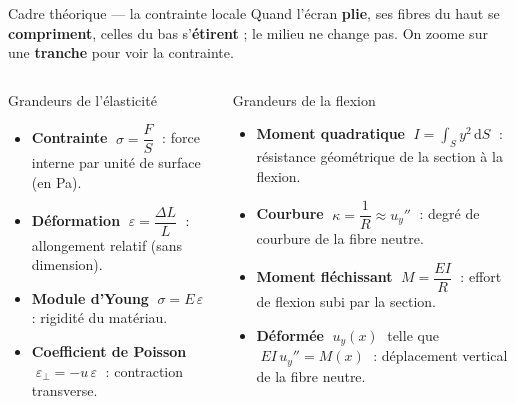 \documentclass[11pt,aspectratio=169]{beamer}
\begin{document}
\begin{frame}{Cadre théorique --- la contrainte locale}
  \footnotesize
  Quand l'écran \textbf{plie}, ses fibres du haut se \textbf{compriment}, celles
  du bas s'\textbf{étirent} ; le milieu ne change pas. On zoome sur une
  \textbf{tranche} pour voir la contrainte.
  \vspace{0.25cm}
  \begin{columns}[c]


\begin{frame}{Grandeurs de l'élasticité}
  \large
  \begin{itemize}\setlength{\itemsep}{14pt}
    \item \textbf{Contrainte} $\;\sigma=\dfrac{F}{S}\;$ : force interne par unité
          de surface (en Pa).
    \item \textbf{Déformation} $\;\varepsilon=\dfrac{\Delta L}{L}\;$ : allongement
          relatif (sans dimension).
    \item \textbf{Module d'Young} $\;\sigma=E\,\varepsilon\;$ : rigidité du matériau.
    \item \textbf{Coefficient de Poisson} $\;\varepsilon_{\perp}=-
u\,\varepsilon\;$ :
          contraction transverse.
  \end{itemize}
\end{frame}

\begin{frame}{Grandeurs de la flexion}
  \large
  \begin{itemize}\setlength{\itemsep}{14pt}
    \item \textbf{Moment quadratique} $\;I=\displaystyle\int_{S} y^{2}\,\mathrm{d}S\;$ :
          résistance géométrique de la section à la flexion.
    \item \textbf{Courbure} $\;\kappa=\dfrac{1}{R}\approx u_y''\;$ : degré de
          courbure de la fibre neutre.
    \item \textbf{Moment fléchissant} $\;M=\dfrac{EI}{R}\;$ : effort de flexion
          subi par la section.
    \item \textbf{Déformée} $\;u_y(x)\;$ telle que $\;EI\,u_y''=M(x)\;$ :
          déplacement vertical de la fibre neutre.
  \end{itemize}
\end{frame}


\end{columns}
\end{frame}
\end{document}
